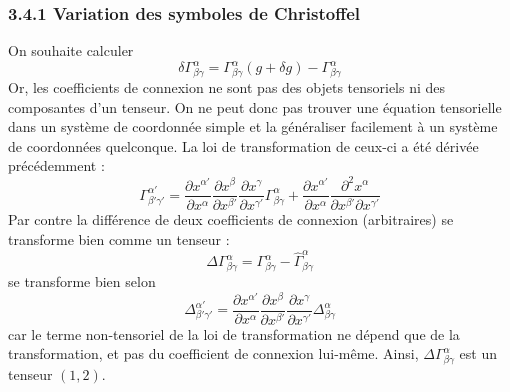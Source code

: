 \subsubsection{3.4.1 Variation des symboles de Christoffel}
On souhaite calculer
\begin{equation}
    \delta \Gamma^{\alpha}_{\beta \gamma} = \Gamma^{\alpha}_{\beta \gamma}(g + \delta g) - \Gamma^{\alpha}_{\beta \gamma}
\end{equation}
Or, les coefficients de connexion ne sont pas des objets tensoriels ni des composantes d'un tenseur. On ne peut donc pas trouver une équation tensorielle dans un système de coordonnée simple et la généraliser facilement à un système de coordonnées quelconque. La loi de transformation de ceux-ci a été dérivée précédemment :
\begin{equation}
    \Gamma^{\alpha '}_{\beta ' \gamma '} = \frac{\partial x^{\alpha '}}{\partial x^{\alpha}}\frac{\partial x^{\beta }}{\partial x^{\beta '}}\frac{\partial x^{\gamma }}{\partial x^{\gamma '}}\Gamma^{\alpha}_{\beta \gamma} + \frac{\partial x^{\alpha '}}{\partial x^{\alpha}}\frac{\partial^2 x^{\alpha}}{\partial x^{\beta '} \partial x^{\gamma '}}
\end{equation}
Par contre la différence de deux coefficients de connexion (arbitraires) se transforme bien comme un tenseur : 
\begin{equation}
    \Delta \Gamma^{\alpha}_{\beta \gamma} = \Gamma^{\alpha}_{\beta \gamma} - \hat{\Gamma}^{\alpha}_{\beta \gamma} 
\end{equation}
se transforme bien selon
\begin{equation}
    \Delta^{\alpha '}_{\beta' \gamma'} = \frac{\partial x^{\alpha '}}{\partial x^{\alpha}}\frac{\partial x^{\beta }}{\partial x^{\beta '}}\frac{\partial x^{\gamma }}{\partial x^{\gamma '}}\Delta^{\alpha}_{\beta \gamma}
\end{equation}
car le terme non-tensoriel de la loi de transformation ne dépend que de la transformation, et pas du coefficient de connexion lui-même. Ainsi, $\Delta \Gamma^{\alpha}_{\beta \gamma}$ est un tenseur $(1,2)$. 


